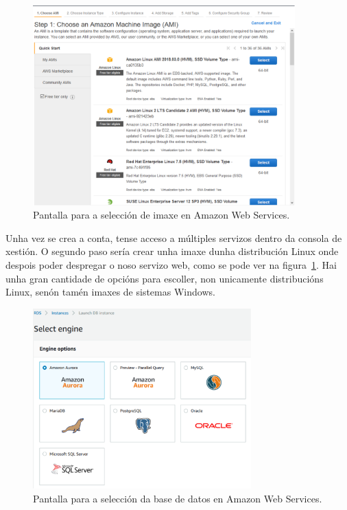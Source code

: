 \begin{figure}[H]
	\begin{center}
		\includegraphics[width=0.9\textwidth]{figures/capturas/AWSImaxes}
		\caption{Pantalla para a selección de imaxe en Amazon Web Services.}
		\label{fig:AWSImaxes}
	\end{center}
\end{figure}


Unha vez se crea a conta, tense acceso a múltiples servizos dentro da consola de xestión. O segundo paso sería crear unha imaxe dunha distribución Linux onde despois poder despregar o noso servizo web, como se pode ver na figura~\ref{fig:AWSImaxes}. Hai unha gran cantidade de opcións para escoller, non unicamente distribucións Linux, senón tamén imaxes de sistemas Windows. 

\begin{figure}[H]
	\begin{center}
		\includegraphics[width=0.75\textwidth]{figures/capturas/AWSBD}
		\caption{Pantalla para a selección da base de datos en Amazon Web Services.}
		\label{fig:AWSBD}
	\end{center}
\end{figure}


